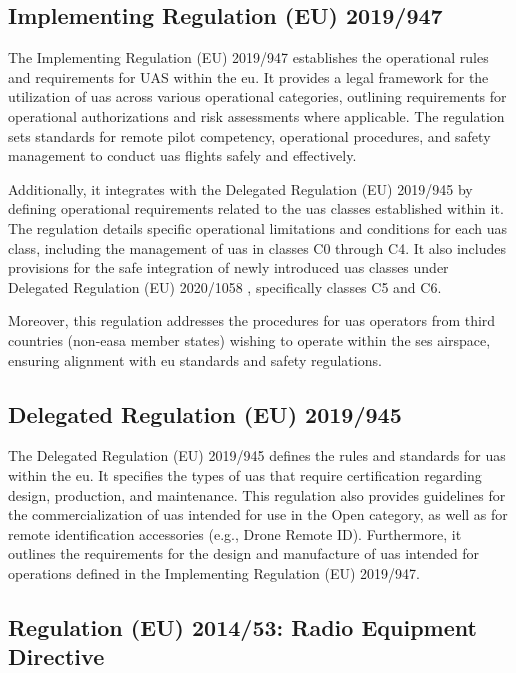 \subsection{Implementing Regulation (EU) 2019/947}
The Implementing Regulation (EU) 2019/947 \autocite{eu-947-2019} establishes the operational rules and requirements for UAS within the \gls{eu}. It provides a legal framework for the utilization of \gls{uas} across various operational categories, outlining requirements for operational authorizations and risk assessments where applicable. The regulation sets standards for remote pilot competency, operational procedures, and safety management to conduct \gls{uas} flights safely and effectively.

Additionally, it integrates with the Delegated Regulation (EU) 2019/945 \autocite{eu-945-2019} by defining operational requirements related to the \gls{uas} classes established within it. The regulation details specific operational limitations and conditions for each \gls{uas} class, including the management of \gls{uas} in classes C0 through C4. It also includes provisions for the safe integration of newly introduced \gls{uas} classes under Delegated Regulation (EU) 2020/1058 \autocite{eu-1058-2020}, specifically classes C5 and C6.

Moreover, this regulation addresses the procedures for \gls{uas} operators from third countries (non-\gls{easa} member states) wishing to operate within the \gls{ses} airspace, ensuring alignment with \gls{eu} standards and safety regulations.

\subsection{Delegated Regulation (EU) 2019/945}
The Delegated Regulation (EU) 2019/945 \autocite{eu-945-2019} defines the rules and standards for \gls{uas} within the \gls{eu}. It specifies the types of \gls{uas} that require certification regarding design, production, and maintenance. This regulation also provides guidelines for the commercialization of \gls{uas} intended for use in the Open category, as well as for remote identification accessories (e.g., Drone Remote ID). Furthermore, it outlines the requirements for the design and manufacture of \gls{uas} intended for operations defined in the Implementing Regulation (EU) 2019/947.

\subsection{Regulation (EU) 2014/53: Radio Equipment Directive}\label{subsec:regulation_eu_radio_equipment_directive}

